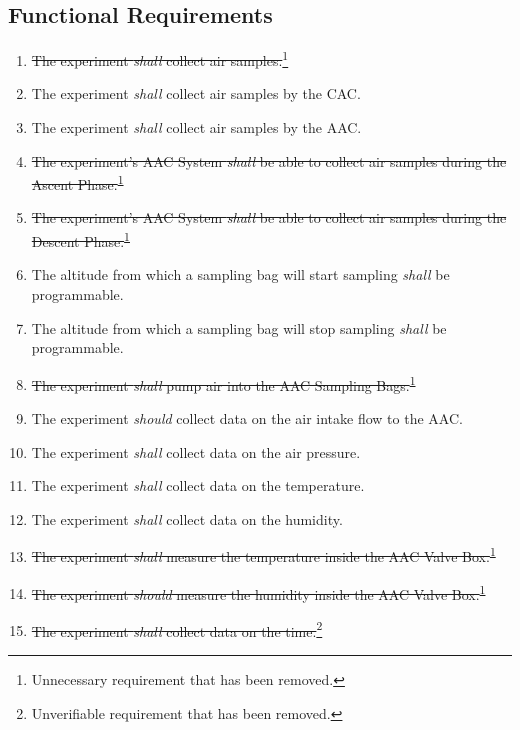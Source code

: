 \subsection{Functional Requirements}

\begin{enumerate}[label=F.\arabic*]
    \item \st{The experiment \textit{shall} collect air samples.}\footnote{Unnecessary requirement that has been removed.\label{fn:unnecessary-requirement}}
    \item The experiment \textit{shall} collect air samples by the CAC.
    \item The experiment \textit{shall} collect air samples by the AAC.
    \item \st{The experiment's AAC System \textit{shall} be able to collect air samples during the Ascent Phase.}\textsuperscript{\ref{fn:unnecessary-requirement}}
    \item \st{The experiment's AAC System \textit{shall} be able to collect air samples during the Descent Phase.}\textsuperscript{\ref{fn:unnecessary-requirement}}
    \item The altitude from which a sampling bag will start sampling \textit{shall} be programmable.
    \item The altitude from which a sampling bag will stop sampling \textit{shall} be programmable.
    \item \st{The experiment \textit{shall} pump air into the AAC Sampling Bags.}\textsuperscript{\ref{fn:unnecessary-requirement}}
    \item The experiment \textit{should} collect data on the air intake flow to the AAC.
    \item The experiment \textit{shall} collect data on the air pressure.
    \item The experiment \textit{shall} collect data on the temperature.
    \item The experiment \textit{shall} collect data on the humidity.
    \item \st{The experiment \textit{shall} measure the temperature inside the AAC Valve Box.}\textsuperscript{\ref{fn:unnecessary-requirement}}
    \item \st{The experiment \textit{should} measure the humidity inside the AAC Valve Box.}\textsuperscript{\ref{fn:unnecessary-requirement}}
    \item \st{The experiment \textit{shall} collect data on the time.}\footnote{Unverifiable requirement that has been removed.\label{fn:unverifiable-requirement}}

\end{enumerate}
